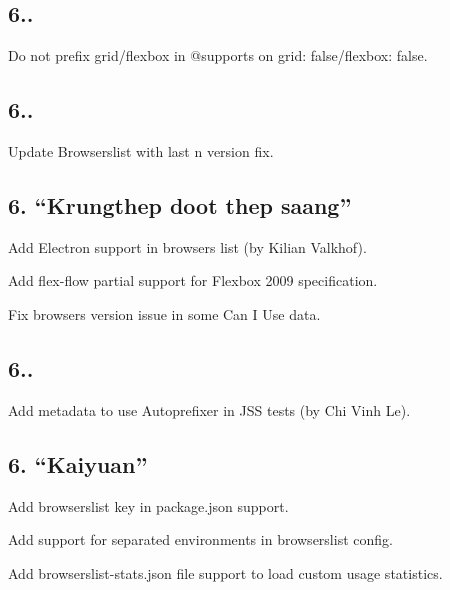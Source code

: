 \subsection*{6..}


\begin{DoxyItemize}
\item Do not prefix grid/flexbox in {\ttfamily @supports} on {\ttfamily grid\+: false}/{\ttfamily flexbox\+: false}.
\end{DoxyItemize}

\subsection*{6..}


\begin{DoxyItemize}
\item Update Browserslist with {\ttfamily last n version} fix.
\end{DoxyItemize}

\subsection*{6. “\+Krungthep doot thep saang”}


\begin{DoxyItemize}
\item Add Electron support in browsers list (by Kilian Valkhof).
\item Add {\ttfamily flex-\/flow} partial support for Flexbox 2009 specification.
\item Fix browsers {} version issue in some Can I Use data.
\end{DoxyItemize}

\subsection*{6..}


\begin{DoxyItemize}
\item Add metadata to use Autoprefixer in J\+SS tests (by Chi Vinh Le).
\end{DoxyItemize}

\subsection*{6. “\+Kaiyuan”}


\begin{DoxyItemize}
\item Add {\ttfamily browserslist} key in {\ttfamily package.\+json} support.
\item Add support for separated environments in browserslist config.
\item Add {\ttfamily browserslist-\/stats.\+json} file support to load custom usage statistics.
\end{DoxyItemize}

